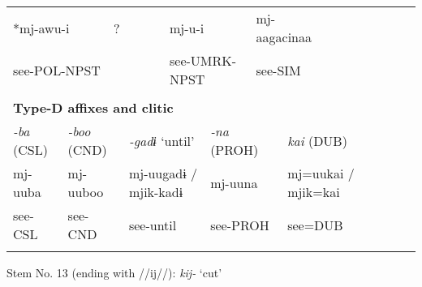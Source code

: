 \begin{tabularx}{\textwidth}{XXXXXXXXXXXXXXXXXXXXXX}
\multicolumn{4}{X}{{ *mj-awu-i}} & \multicolumn{3}{X}{?} & \multicolumn{4}{X}{mj-u-i} & \multicolumn{4}{X}{{ mj-aagacinaa}} & \multicolumn{7}{X}{}\\
\multicolumn{4}{X}{see-POL-NPST} & \multicolumn{3}{X}{} & \multicolumn{4}{X}{see-UMRK-NPST} & \multicolumn{4}{X}{see-SIM} & \multicolumn{7}{X}{}\\
\multicolumn{22}{X}{}\\
\multicolumn{22}{X}{{\bfseries Type-D affixes and clitic}}\\
{ \textit{{}-ba} (CSL)} & \multicolumn{4}{X}{{ \textit{{}-boo} (CND)}} & \multicolumn{4}{X}{{ \textit{{}-gadɨ} ‘until’}} & \multicolumn{3}{X}{{ \textit{{}-na} (PROH)}} & \multicolumn{10}{X}{{ \textit{kai} (DUB)}}\\
{ mj-uuba} & \multicolumn{4}{X}{{ mj-uuboo}} & \multicolumn{4}{X}{{ mj-uugadɨ / mjik-kadɨ}} & \multicolumn{3}{X}{{ mj-uuna}} & \multicolumn{10}{X}{{ mj=uukai / mjik=kai}}\\
see-CSL & \multicolumn{4}{X}{see-CND} & \multicolumn{4}{X}{see-until} & \multicolumn{3}{X}{see-PROH} & \multicolumn{10}{X}{see=DUB}\\
\lspbottomrule
\end{tabularx}
Stem No. 13 (ending with //ij//): \textit{kij-} ‘cut’

\tablefirsthead{}

